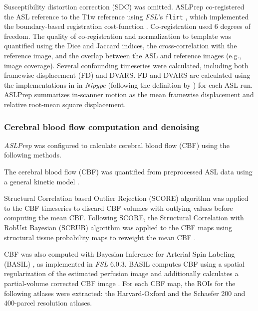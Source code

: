 \documentclass[]{article}
\begin{document}
Susceptibility distortion correction (SDC) was omitted. ASLPrep
co-registered the ASL reference to the T1w reference using \emph{FSL}'s
\texttt{flirt} \citep{flirt}, which implemented the boundary-based
registration cost-function \citep{bbr}. Co-registration used 6 degrees
of freedom. The quality of co-registration and normalization to template
was quantified using the Dice and Jaccard indices, the cross-correlation
with the reference image, and the overlap between the ASL and reference
images (e.g., image coverage). Several confounding timeseries were
calculated, including both framewise displacement (FD) and DVARS. FD and
DVARS are calculated using the implementations in in \emph{Nipype}
(following the definition by \citep{power_fd_dvars}) for each ASL run.
ASLPrep summarizes in-scanner motion as the mean framewise displacement
and relative root-mean square displacement.

\hypertarget{cerebral-blood-flow-computation-and-denoising}{%
\subsubsection{Cerebral blood flow computation and
denoising}\label{cerebral-blood-flow-computation-and-denoising}}

\emph{ASLPrep} was configured to calculate cerebral blood flow (CBF)
using the following methods.

The cerebral blood flow (CBF) was quantified from preprocessed ASL data
using a general kinetic model
\citep{detre_perfusion, alsop_recommended}.

Structural Correlation based Outlier Rejection (SCORE) algorithm was
applied to the CBF timeseries to discard CBF volumes with outlying
values \citep{score_dolui} before computing the mean CBF. Following
SCORE, the Structural Correlation with RobUst Bayesian (SCRUB) algorithm
was applied to the CBF maps using structural tissue probability maps to
reweight the mean CBF \citep{score_dolui, scrub_dolui}.

CBF was also computed with Bayesian Inference for Arterial Spin Labeling
(BASIL) \citep{chappell_basil}, as implemented in \emph{FSL} 6.0.3.
BASIL computes CBF using a spatial regularization of the estimated
perfusion image and additionally calculates a partial-volume corrected
CBF image \citep{chappell_pvc}. For each CBF map, the ROIs for the
following atlases were extracted: the Harvard-Oxford and the Schaefer
200 and 400-parcel resolution atlases.
\end{document}
